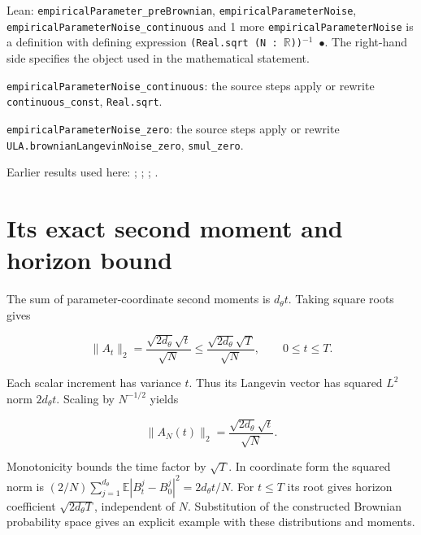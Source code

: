 \documentclass[11pt,a4paper]{article}
\begin{document}
\begin{leanbox}{Lean: \texttt{empiricalParameter\_\allowbreak{}preBrownian}, \texttt{empiricalParameterNoise}, \texttt{empiricalParameterNoise\_\allowbreak{}continuous} and 1 more}
\texttt{empirical\allowbreak{}Parameter\allowbreak{}Noise} is a definition with defining expression \texttt{(Real.\allowbreak{}sqrt (N : \ensuremath{\mathbb R}))\ensuremath{{}^{-1}} \ensuremath{\bullet}}. The right-hand side specifies the object used in the mathematical statement.



\texttt{empirical\allowbreak{}Parameter\allowbreak{}Noise\_\allowbreak{}continuous}: the source steps apply or rewrite \texttt{continuous\_\allowbreak{}const}, \texttt{Real.\allowbreak{}sqrt}.



\texttt{empirical\allowbreak{}Parameter\allowbreak{}Noise\_\allowbreak{}zero}: the source steps apply or rewrite \texttt{ULA.\allowbreak{}brownian\allowbreak{}Langevin\allowbreak{}Noise\_\allowbreak{}zero}, \texttt{smul\_\allowbreak{}zero}.
\end{leanbox}


Earlier results used here: \cite[Section~3.25.1]{LangevinLean2026ULASC}; \cite[Section~3.25.2]{LangevinLean2026ULASC}; \cite[Section~3.25.3]{LangevinLean2026ULASC}; \cite[Section~3.32.1]{LangevinLean2026ULASC}.

\section{\texorpdfstring{Its exact second moment and horizon bound}{Its exact second moment and horizon bound}}


The sum of parameter-coordinate second moments is \(d_\theta t\). Taking square roots gives

\[\|A_t\|_2=\frac{\sqrt{2d_\theta}\sqrt t}{\sqrt N}\le\frac{\sqrt{2d_\theta}\sqrt T}{\sqrt N},\qquad0\le t\le T.\]

Each scalar increment has variance \(t\). Thus its Langevin vector has squared \(L^2\) norm \(2d_\theta t\). Scaling by \(N^{-1/2}\) yields

\[\|A_N(t)\|_2=\frac{\sqrt{2d_\theta}\sqrt t}{\sqrt N}.\]

Monotonicity bounds the time factor by \(\sqrt T\). In coordinate form the squared norm is \((2/N)\sum_{j=1}^{d_\theta}\mathbb E|B_t^j-B_0^j|^2=2d_\theta t/N\). For \(t\le T\) its root gives horizon coefficient \(\sqrt{2d_\theta T}\), independent of \(N\). Substitution of the constructed Brownian probability space gives an explicit example with these distributions and moments.
\end{document}
